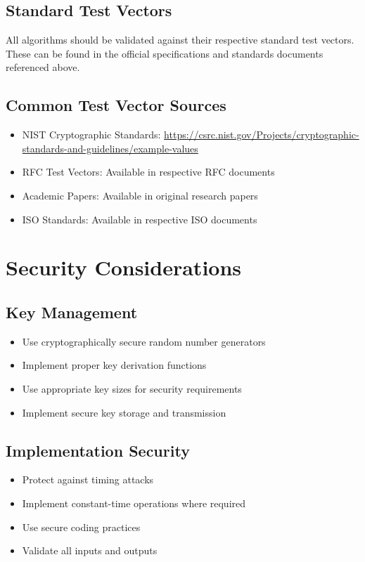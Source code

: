 \documentclass[11pt,a4paper]{article}
\begin{document}
\subsection{Standard Test Vectors}
All algorithms should be validated against their respective standard test vectors. These can be found in the official specifications and standards documents referenced above.

\subsection{Common Test Vector Sources}
\begin{itemize}
    \item NIST Cryptographic Standards: \url{https://csrc.nist.gov/Projects/cryptographic-standards-and-guidelines/example-values}
    \item RFC Test Vectors: Available in respective RFC documents
    \item Academic Papers: Available in original research papers
    \item ISO Standards: Available in respective ISO documents
\end{itemize}

\section{Security Considerations}

\subsection{Key Management}
\begin{itemize}
    \item Use cryptographically secure random number generators
    \item Implement proper key derivation functions
    \item Use appropriate key sizes for security requirements
    \item Implement secure key storage and transmission
\end{itemize}

\subsection{Implementation Security}
\begin{itemize}
    \item Protect against timing attacks
    \item Implement constant-time operations where required
    \item Use secure coding practices
    \item Validate all inputs and outputs
\end{itemize}
\end{document}
